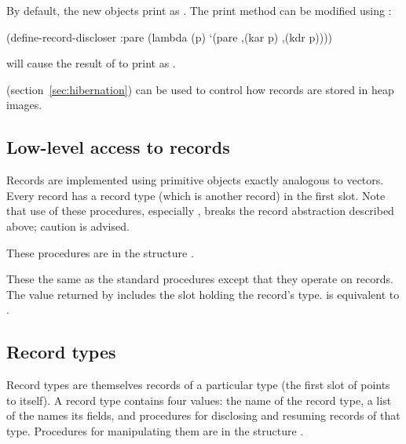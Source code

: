 By default, the new objects print as .
The print method can be modified using :
\begin{example}
(define-record-discloser :pare
  (lambda (p) `(pare ,(kar p) ,(kdr p))))
\end{example}
 will cause the result of  to print as
 .

 (section~\ref{sec:hibernation})
 can be used to control how records are stored in heap images.

\subsection{Low-level access to records}

Records are implemented using primitive objects exactly analogous
 to vectors.
Every record has a record type (which is another record) in the first slot.
Note that use of these procedures, especially , breaks
 the record abstraction described above; caution is advised.

These procedures are in the structure .

\begin{protos}
\end{protos}
\noindent
These the same as the standard  procedures except that they
 operate on records.
The value returned by  includes the slot holding the
 record's type.
 is equivalent to .

\subsection{Record types}

Record types are themselves records of a particular type (the first slot
 of  points to itself).
A record type contains four values: the name of the record type, a list of
 the names its fields, and procedures for disclosing and resuming records
 of that type.
Procedures for manipulating them are in the structure .

